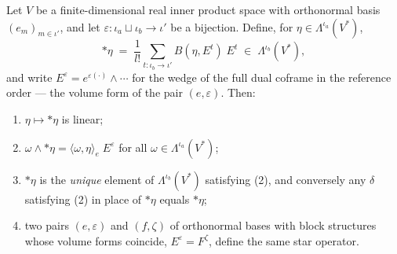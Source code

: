 \begin{proposition}
\label{prop:hodge-star-pointwise}
\leanok
{}
Let $V$ be a finite-dimensional real inner product space with orthonormal basis $(e_m)_{m \in \iota'}$, and let $\varepsilon \colon \iota_a \sqcup \iota_b \to \iota'$ be a bijection. Define, for $\eta \in \Lambda^{\iota_a}(V^*)$,
\[
{*}\eta \;=\; \frac{1}{l!} \sum_{t \colon \iota_b \to \iota'} B(\eta, E^t)\; E^t \;\in\; \Lambda^{\iota_b}(V^*),
\]
and write $E^\varepsilon = e^{\varepsilon(\cdot)} \wedge \cdots$ for the wedge of the full dual coframe in the reference order --- the volume form of the pair $(e, \varepsilon)$. Then:
\begin{enumerate}
\item $\eta \mapsto {*}\eta$ is linear;
\item $\omega \wedge {*}\eta = \langle \omega, \eta \rangle_e\; E^\varepsilon$ for all $\omega \in \Lambda^{\iota_a}(V^*)$;
\item ${*}\eta$ is the \emph{unique} element of $\Lambda^{\iota_b}(V^*)$ satisfying (2), and conversely any $\delta$ satisfying (2) in place of ${*}\eta$ equals ${*}\eta$;
\item two pairs $(e, \varepsilon)$ and $(f, \zeta)$ of orthonormal bases with block structures whose volume forms coincide, $E^\varepsilon = F^{\zeta}$, define the same star operator.
\end{enumerate}
\end{proposition}
